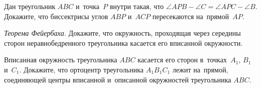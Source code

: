 \begin{problems}
\item
Дан треугольник $ABC$ и~точка~$P$ внутри такая, что
$\angle APB - \angle C = \angle APC - \angle B$.
Докажите, что биссектрисы углов $ABP$ и~$ACP$ пересекаются на~прямой~$AP$.

\item \emph{Теорема Фейербаха.}\enspace
Докажите, что окружность, проходящая через середины сторон неравнобедренного
треугольника касается его вписанной окружности.

\item
Вписанная окружность треугольника $ABC$ касается его сторон в~точках~$A_1$,
$B_1$ и~$C_1$.
Докажите, что ортоцентр треугольника $A_1 B_1 C_1$ лежит на~прямой, соединяющей
центры вписанной и~описанной окружностей треугольника $ABC$.

\end{problems}


